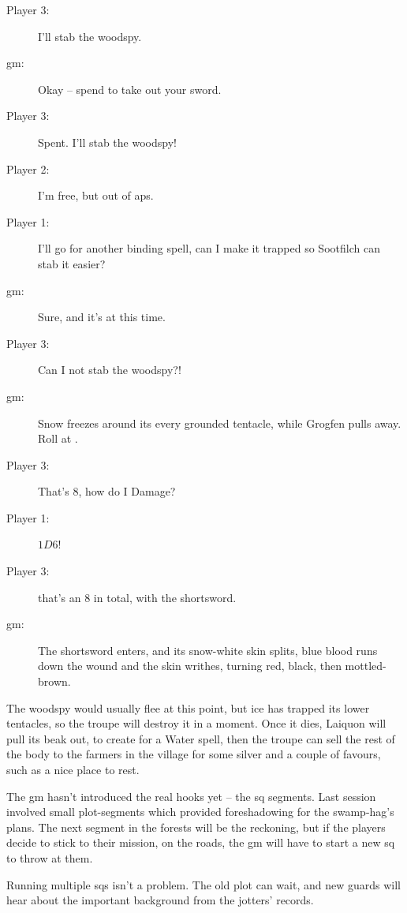 \begin{multicols}{3}
\begin{description}
  \item[Player 3:]
  I'll stab the \gls{woodspy}.
  \item[\gls{gm}:]
  Okay -- spend  to take out your sword.
  \item[Player 3:]
  Spent.
  I'll stab the \gls{woodspy}!
  \item[Player 2:]
  I'm free, but out of \glspl{ap}.
  \item[Player 1:]
  I'll go for another binding spell, can I make it trapped so Sootfilch can stab it easier?
  \item[\gls{gm}:]
  Sure, and it's at \tn[10] this time.
  \item[Player 3:]
  Can I not stab the \gls{woodspy}?!
  \item[\gls{gm}:]
  Snow freezes around its every grounded tentacle, while Grogfen pulls away.
  Roll  at \tn[7].
  \item[Player 3:]
  That's 8, how do I Damage?
  \item[Player 1:]
  $1D6$!
  \item[Player 3:]
   that's an 8 in total, with the shortsword.
  \item[\gls{gm}:]
  The shortsword enters, and its snow-white skin splits, blue blood runs down the wound and the skin writhes, turning red, black, then mottled-brown.
\end{description}

\bigLine
\vspace{\baselineskip}

The \gls{woodspy} would usually flee at this point, but ice has trapped its lower tentacles, so the troupe will destroy it in a moment.
Once it dies, Laiquon will pull its beak out, to create  for a Water spell, then the troupe can sell the rest of the body to the farmers in the \gls{village} for some silver and a couple of favours, such as a nice place to rest.

The \gls{gm} hasn't introduced the real hooks yet -- the \gls{sq} \glspl{segment}.
Last session involved small plot-\glspl{segment} which provided foreshadowing for the swamp-hag's plans.
The next \gls{segment} in the forests will be the reckoning, but if the players decide to stick to their mission, on the roads, the \gls{gm} will have to start a new \gls{sq} to throw at them.

Running multiple \glspl{sq} isn't a problem.
The old plot can wait, and new \glspl{guard} will hear about the important background from the \glspl{jotter}' records.


\end{multicols}

\clearpage
